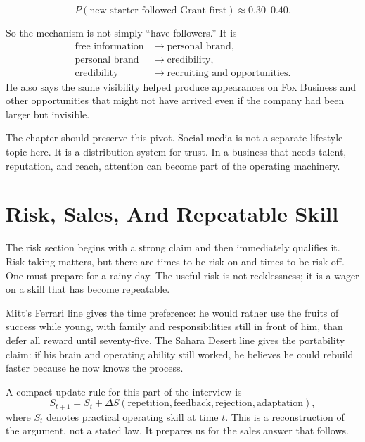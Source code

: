 \begin{equation}
P(\text{new starter followed Grant first})
\approx 0.30\text{--}0.40.
\end{equation}

So the mechanism is not simply ``have followers.'' It is
\begin{align}
\text{free information} &\longrightarrow \text{personal brand},\\
\text{personal brand} &\longrightarrow \text{credibility},\\
\text{credibility} &\longrightarrow \text{recruiting and opportunities}.
\end{align}
He also says the same visibility helped produce appearances on Fox Business and other opportunities that might not have arrived even if the company had been larger but invisible.

The chapter should preserve this pivot. Social media is not a separate lifestyle topic here. It is a distribution system for trust. In a business that needs talent, reputation, and reach, attention can become part of the operating machinery.

\section{Risk, Sales, And Repeatable Skill}

The risk section begins with a strong claim and then immediately qualifies it. Risk-taking matters, but there are times to be risk-on and times to be risk-off. One must prepare for a rainy day. The useful risk is not recklessness; it is a wager on a skill that has become repeatable.

Mitt's Ferrari line gives the time preference: he would rather use the fruits of success while young, with family and responsibilities still in front of him, than defer all reward until seventy-five. The Sahara Desert line gives the portability claim: if his brain and operating ability still worked, he believes he could rebuild faster because he now knows the process.

A compact update rule for this part of the interview is
\begin{equation}
S_{t+1}=S_t+\Delta S(\text{repetition},\text{feedback},\text{rejection},\text{adaptation}),
\end{equation}
where \(S_t\) denotes practical operating skill at time \(t\). This is a reconstruction of the argument, not a stated law. It prepares us for the sales answer that follows.

